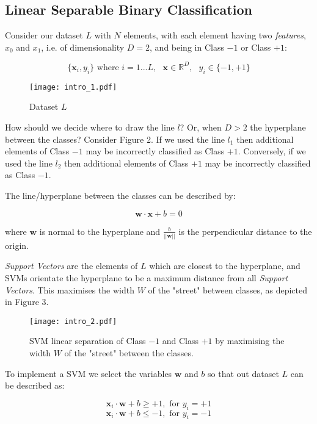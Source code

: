 \documentclass[10pt, a4paper]{amsart}
\begin{document}
\subsection{Linear Separable Binary Classification}

Consider our dataset $L$ with $N$ elements, with each element having two \emph{features}, $x_0$ and $x_1$, i.e. of dimensionality $D = 2$, and being in Class $-1$ or Class $+1$:

\[\{\mathbf{x}_i, y_i\}\text{ where }i = 1...L,\text{ }\mathbf{x} \in \mathbb{R}^{D},\text{ }y_i \in \{-1, +1\}\]

\begin{figure}
	\centering	
	\texttt{[image: intro\_1.pdf]}
	\caption{Dataset $L$}
\end{figure}

How should we decide where to draw the line $l$? Or, when $D > 2$ the hyperplane between the classes? Consider Figure 2. If we used the line $l_1$ then additional elements of Class $-1$ may be incorrectly classified as Class $+1$. Conversely, if we used the line $l_2$ then additional elements of Class $+1$ may be incorrectly classified as Class $-1$.

The line/hyperplane between the classes can be described by:

\[\mathbf{w}\cdot\mathbf{x} + b = 0\]

where $\mathbf{w}$ is normal to the hyperplane and $\frac{b}{||\mathbf{w}||}$ is the perpendicular distance to the origin.

\emph{Support Vectors} are the elements of $L$ which are closest to the hyperplane, and SVMs orientate the hyperplane to be a maximum distance from all \emph{Support Vectors}. This maximises the width $W$ of the "street" between classes, as depicted in Figure 3.

\begin{figure}
	\centering	
	\texttt{[image: intro\_2.pdf]}
	\caption{SVM linear separation of Class $-1$ and Class $+1$ by maximising the width $W$ of the "street" between the classes.}
\end{figure}

To implement a SVM we select the variables $\mathbf{w}$ and $b$ so that out dataset $L$ can be described as:

\[\mathbf{x}_i\cdot\mathbf{w} + b \geq +1,\text{ for }y_i = +1\]
\[\mathbf{x}_i\cdot\mathbf{w} + b \leq -1,\text{ for }y_i = -1\]
\end{document}
